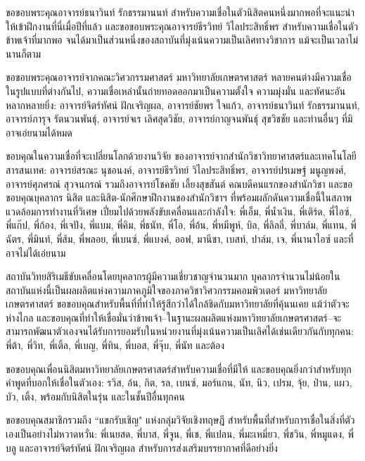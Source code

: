 \documentclass[16pt,a4]{internshipreport}
\begin{document}
ขอขอบพระคุณอาจารย์ธนาวินท์ รักธรรมานนท์ สำหรับความเชื่อในตัวนิสิตคนหนึ่งมากพอที่จะแนะนำให้เข้าฝึกงานที่นี่เมื่อปีที่แล้ว และขอขอบพระคุณอาจารย์ธีรวิทย์ วิไลประสิทธิ์พร สำหรับความเชื่อในตัวข้าพเจ้าที่มากพอ จนได้มาเป็นส่วนหนึ่งของสถาบันที่มุ่งเน้นความเป็นเลิศทางวิชาการ แม้จะเป็นเวลาไม่นานก็ตาม

ขอขอบพระคุณอาจารย์จากคณะวิศวกรรมศาสตร์ มหาวิทยาลัยเกษตรศาสตร์ หลายคนต่างมีความเชื่อในรูปแบบที่ต่างกันไป, ความเชื่อเหล่านั้นถ่ายทอดออกมาเป็นความตั้งใจ ความมุ่งมั่น และทัศนะอันหลากหลายยิ่ง: อาจารย์จิตร์ทัศน์ ฝักเจริญผล, อาจารย์ชัยพร ใจแก้ว, อาจารย์ธนาวินท์ รักธรรมานนท์, อาจารย์ภารุจ รัตนวนพันธุ์, อาจารย์จเร เลิศสุดวิชัย, อาจารย์กาญจนพันธุ์ สุขวิชชัย และท่านอื่นๆ ที่มิอาจเอ่ยนามได้หมด

ขอบคุณในความเชื่อที่จะเปลี่ยนโลกด้วยงานวิจัย ของอาจารย์จากสำนักวิชาวิทยาศาสตร์และเทคโนโลยีสารสนเทศ: อาจารย์สรณะ นุชอนงค์, อาจารย์ธีรวิทย์ วิไลประสิทธิ์พร, อาจารย์ปรเมษฐ์ มนูญพงศ์, อาจารย์ศุภศรณ์ สุวจนกรณ์ รวมถึงอาจารย์โชคชัย เลี้ยงสุขสันต์ คณบดีคนแรกของสำนักวิชา และขอขอบคุณบุคลากร นิสิต และนิสิต-นักศึกษาฝึกงานของสำนักวิชาฯ ที่พร้อมผลักดันความเชื่อนี้ในสภาพแวดล้อมการทำงานที่วิเศษ เปี่ยมไปด้วยพลังขับเคลื่อนและกำลังใจ: พี่เอ็ม, พี่น้ำเงิน, พี่เติร์ด, พี่ไอซ์, พี่แก๊ป, พี่ก้อง, พี่เจปัง, พี่แบม, พี่คิม, พี่ธนัท, พี่โอ, พี่อ้น, พี่หมีพูห์, บิล, พี่ลิลลี่, พี่บาล์ม, พี่แทน, พี่ฉัตร, พี่มินท์, พี่ส้ม, พี่พลอย, พี่เบนซ์, พี่แบงค์, ออฟ, มานีชา, เบสท์, ปาล์ม, เจ, พี่นานาไอซ์ และที่อาจไม่ได้เอ่ยนาม

สถาบันวิทยสิริเมธีขับเคลื่อนโดยบุคลากรผู้มีความเชี่ยวชาญจำนวนมาก บุคลากรจำนวนไม่น้อยในสถาบันแห่งนี้เป็นผลผลิตแห่งความภาคภูมิใจของภาควิชาวิศวกรรมคอมพิวเตอร์ มหาวิทยาลัยเกษตรศาสตร์ ขอขอบคุณสำหรับพื้นที่ที่ทำให้รู้สึกว่าได้ใกล้ชิดกับมหาวิทยาลัยที่คุ้นนเคย แม้ว่าตัวจะห่างไกล และขอบคุณที่ทำให้เชื่อมั่นว่าข้าพเจ้า--ในฐานะผลผลิตแห่งมหาวิทยาลัยเกษตรศาสตร์--จะสามารถพัฒนาตัวเองจนได้รับการยอมรับในหน่วยงานที่มุ่งเน้นความเป็นเลิศได้เช่นเดียวกันกับทุกคน: พี่ต้า, พี่วิท, พี่เติ้ล, พี่เบญ, พี่ทิน, พี่บอส, พี่จุ๊บ, พี่นัท และต้อง

ขอขอบคุณเพื่อนนิสิตมหาวิทยาลัยเกษตรศาสตร์สำหรับความเชื่อที่มีให้ และขอบคุณยิ่งกว่าสำหรับทุกคำพูดที่บอกให้เชื่อในตัวเอง: รวิส, อ้น, กิต, รล, เบนซ์, มอร์แกน, นัท, นิว, เปรม, จุ้ย, ป่าน, แผว, บัว, เติ้ง, พร้อมกับนิสิตในรุ่น และในชั้นปีอื่นทุกคน

ขอขอบคุณสมาชิกรวมถึง ``แขกรับเชิญ" แห่งกลุ่มวิจัยเชิงทฤษฎี สำหรับพื้นที่สำหรับการเชื่อในสิ่งที่ตัวเองเป็นอย่างไม่หวาดหวั่น: พี่เนยสด, พี่บาส, พี่จูน, พี่เช, พี่แปลน, พี่มะเหมี่ยว, พี่ชวิน, พี่หมูแดง, พี่บลู และอาจารย์จิตร์ทัศน์ ฝักเจริญผล สำหรับการส่งเสริมบรรยากาศที่ดีอย่างยิ่ง
\end{document}
